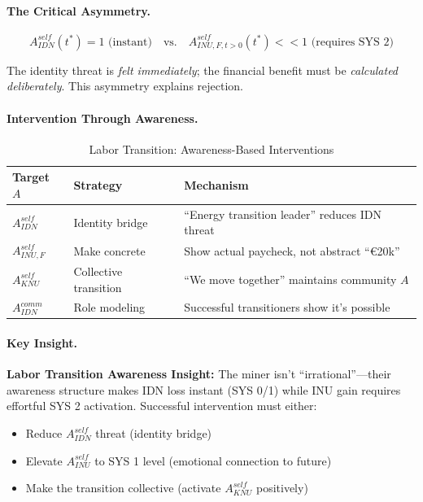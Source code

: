 \paragraph{The Critical Asymmetry.}
\begin{equation}
A^{self}_{IDN}(t^*) = 1 \text{ (instant)} \quad \text{vs.} \quad A^{self}_{INU,F,t>0}(t^*) << 1 \text{ (requires SYS 2)}
\end{equation}

The identity threat is \emph{felt immediately}; the financial benefit must be 
\emph{calculated deliberately}. This asymmetry explains rejection.

\paragraph{Intervention Through Awareness.}

\begin{table}[htbp]
\centering
\caption{Labor Transition: Awareness-Based Interventions}
\label{tab:labor-intervention}
\renewcommand{\arraystretch}{1.3}
\begin{tabular}{@{}lll@{}}
\toprule
\textbf{Target $A$} & \textbf{Strategy} & \textbf{Mechanism} \\
\midrule
$A^{self}_{IDN}$ & Identity bridge & ``Energy transition leader'' reduces IDN threat \\
$A^{self}_{INU,F}$ & Make concrete & Show actual paycheck, not abstract ``\euro{20k}'' \\
$A^{self}_{KNU}$ & Collective transition & ``We move together'' maintains community $A$ \\
$A^{comm}_{IDN}$ & Role modeling & Successful transitioners show it's possible \\
\bottomrule
\end{tabular}
\end{table}

\paragraph{Key Insight.}
\begin{tcolorbox}[colback=yellow!10!white, colframe=yellow!50!black]
\textbf{Labor Transition Awareness Insight:}
The miner isn't ``irrational''---their awareness structure makes IDN loss 
instant (SYS 0/1) while INU gain requires effortful SYS 2 activation.
Successful intervention must either:
\begin{itemize}
\item Reduce $A^{self}_{IDN}$ threat (identity bridge)
\item Elevate $A^{self}_{INU}$ to SYS 1 level (emotional connection to future)
\item Make the transition collective (activate $A^{self}_{KNU}$ positively)
\end{itemize}
\end{tcolorbox}

